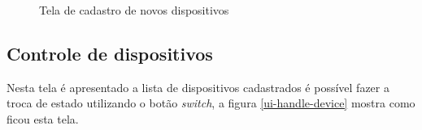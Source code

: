 \begin{figure}[H]
\caption{\label{ui-new-device} Tela de cadastro de novos dispositivos}
\end{figure}

\subsection{Controle de dispositivos}
Nesta tela é apresentado a lista de dispositivos cadastrados é possível fazer a troca de estado utilizando o botão \textit{switch}, a figura \ref{ui-handle-device} mostra como ficou esta tela.

